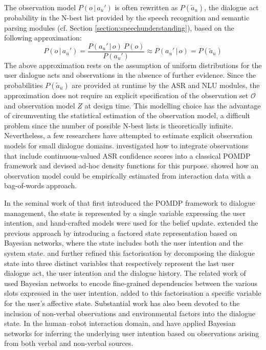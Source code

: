 The observation model $P(o \, | \, a_u')$ is often rewritten as $P(\tilde{a}_u)$, the dialogue act probability in the N-best list provided by the speech recognition and semantic parsing modules (cf. Section \ref{section:speechunderstanding}), based on the following approximation:
\begin{equation}
P(o \, | \, a_u') = \frac{P(a_u' \, | \, o) \ P(o)} {P(a_u')} \approx P(a_u' \, | \, o) = P(\tilde{a}_u)
\end{equation}
The above approximation rests on the assumption of uniform distributions for the user dialogue acts and observations in the absence of further evidence. Since the probabilities $P(\tilde{a}_u)$ are provided at runtime by the ASR and NLU modules, the approximation does not require an explicit specification of the observation set $\mathcal{O}$ and observation model $Z$ at design time.  This modelling choice has the advantage of circumventing the statistical estimation of the observation model, a difficult problem since the number of possible N-best lists is theoretically infinite. Nevertheless, a few researchers have attempted to estimate explicit observation models for small dialogue domains. \cite{Williamsetal:2008} investigated how to integrate observations that include continuous-valued ASR confidence scores into a classical POMDP framework and devised ad-hoc density functions for this purpose.  \cite{chinaei2012} showed how an observation model could be empirically estimated from interaction data with a bag-of-words approach. 

In the seminal work of \cite{Roy:2000} that first introduced the POMDP framework to dialogue management, the state is represented by a single variable expressing the user intention, and hand-crafted models were used for the belief update. \cite{zhang2001} extended the previous approach by introducing a factored state representation based on Bayesian networks, where the state includes both the user intention and the system state. \cite{williams2005factored} and \cite{Young:2010} further refined this factorisation by decomposing the dialogue state into three distinct variables that respectively represent the last user dialogue act, the user intention and the dialogue history. The related work of \cite{Thomson:2010:BUD:1772996.1773040} used Bayesian networks to encode fine-grained dependencies between the various slots expressed in the user intention. \cite{bui2010} added to this factorisation a specific variable for the user's affective state. Substantial work has also been devoted to the inclusion of non-verbal observations and environmental factors into the dialogue state. In the human--robot interaction domain, \cite{prodanov2003bayesian} and \cite{Hong:2007} have applied Bayesian networks for inferring the underlying user intention based on observations arising from both verbal and non-verbal sources. 

